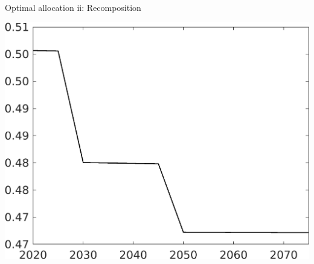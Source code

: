 \documentclass[11pt,aspectratio=169]{beamer}
\begin{document}
\begin{frame}{Optimal allocation ii: Recomposition}
\begin{minipage}[]{0.32\textwidth}
	\end{minipage}
\begin{minipage}[]{0.32\textwidth}
	\includegraphics[width=1\textwidth]{../codding_model/own_basedOnFried/optimalPol_elastS_DisuSci/figures/all_1705/Single_OPT_T_NoTaus_EY_spillover0_sep1_BN1_ineq0_red0_etaa0.79.png}
\end{minipage}
\end{frame}
\end{document}
